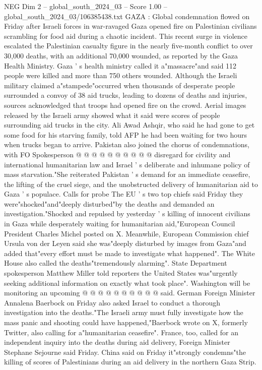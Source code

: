 \begin{textsample}{NEG Dim 2 – global\_south\_2024\_03 – Score 1.00 – global\_south\_2024\_03/106385438.txt}  \label{ex:f2_neg_108}
GAZA : Global condemnation flowed on Friday after Israeli forces in war-ravaged Gaza opened fire on Palestinian civilians scrambling for food aid during a chaotic incident.
This recent surge in violence escalated the Palestinian casualty figure in the nearly five-month conflict to over 30,000 deaths, with an additional 70,000 wounded, as reported by the Gaza Health Ministry.
Gaza ' s health ministry called it a"massacre"and said 112 people were killed and more than 750 others wounded.
Although the Israeli military claimed a"stampede"occurred when thousands of desperate people surrounded a convoy of 38 aid trucks, leading to dozens of deaths and injuries, sources acknowledged that troops had opened fire on the crowd.
Aerial images released by the Israeli army showed what it said were scores of people surrounding aid trucks in the city.
Ali Awad Ashqir, who said he had gone to get some food for his starving family, told AFP he had been waiting for two hours when trucks began to arrive.
Pakistan also joined the chorus of condemnations, with FO Spokesperson @ @ @ @ @ @ @ @ @ @ disregard for civility and international humanitarian law and Israel ' s deliberate and inhumane policy of mass starvation."She reiterated Pakistan ' s demand for an immediate ceasefire, the lifting of the cruel siege, and the unobstructed delivery of humanitarian aid to Gaza ' s populace.
Calls for probe The EU ' s two top chiefs said Friday they were"shocked"and"deeply disturbed"by the deaths and demanded an investigation."Shocked and repulsed by yesterday ' s killing of innocent civilians in Gaza while desperately waiting for humanitarian aid,"European Council President Charles Michel posted on X.
Meanwhile, European Commission chief Ursula von der Leyen said she was"deeply disturbed by images from Gaza"and added that"every effort must be made to investigate what happened".
The White House also called the deaths"tremendously alarming".
State Department spokesperson Matthew Miller told reporters the United States was"urgently seeking additional information on exactly what took place".
Washington will be monitoring an upcoming @ @ @ @ @ @ @ @ @ @ said.
German Foreign Minister Annalena Baerbock on Friday also asked Israel to conduct a thorough investigation into the deaths."The Israeli army must fully investigate how the mass panic and shooting could have happened,"Baerbock wrote on X, formerly Twitter, also calling for a"humanitarian ceasefire".
France, too, called for an independent inquiry into the deaths during aid delivery, Foreign Minister Stephane Sejourne said Friday.
China said on Friday it"strongly condemns"the killing of scores of Palestinians during an aid delivery in the northern Gaza Strip.

\end{textsample}
